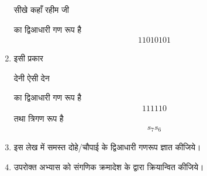 \begin{enumerate}[label=\thesection.\arabic*.,ref=\thesection.\theenumi]
\label{chand:one}
\begin{flushleft}
सीखे कहाँ रहीम जी
\end{flushleft}
 का द्विआधारी गण रूप है 
\begin{align}
11010101
\end{align}
\item इसी प्रकार 
\begin{flushleft}
देनी ऐसी देन
\end{flushleft}
 का द्विआधारी गण रूप है 
\begin{align}
111110
\end{align}
तथा त्रिगण रूप है 
\begin{align}
s_7s_6
\end{align}
%
\item इस लेख में समस्त दोहे/चौपाई के द्विआधारी गणरूप ज्ञात कीजिये। 
\item उपरोक्त अभ्यास को संगणिक क्रमादेश के द्वारा क्रियान्वित कीजिये। 

\end{enumerate}

